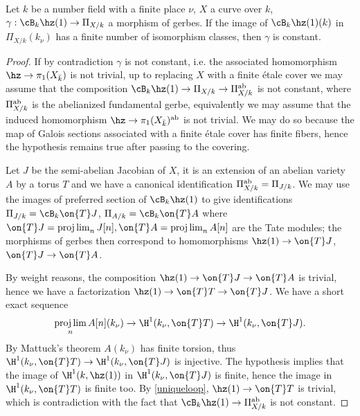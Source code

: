 \begin{lemma}
\notready\label{uniqueloop1}
	Let $k$ be a number field with a finite place $\nu$, $X$ a curve over $k$, $\gamma:\cB_{k}\hz(1)\to\Pi_{X/k}$ a morphism of gerbes. If the image of $\cB_{k}\hz(1)(k)$ in $\Pi_{X/k}(k_{\nu})$ has a finite number of isomorphism classes, then $\gamma$ is constant.
	\begin{proof}
		If by contradiction $\gamma$ is not constant, i.e. the associated homomorphism $\hz\to\pi_{1}(X_{\bar{k}})$ is not trivial, up to replacing $X$ with a finite étale cover we may assume that the composition $\cB_{k}\hz(1)\to\Pi_{X/k}\to\Pi_{X/k}^{\rm ab}$ is not constant, where $\Pi_{X/k}^{\rm ab}$ is the abelianized fundamental gerbe, equivalently we may assume that the induced homomorphism $\hz\to\pi_{1}(X_{\bar{k}})^{\rm ab}$ is not trivial. We may do so because the map of Galois sections associated with a finite étale cover has finite fibers, hence the hypothesis remains true after passing to the covering.

		Let $J$ be the semi-abelian Jacobian of $X$, it is an extension of an abelian variety $A$ by a torus $T$ and we have a canonical identification $\Pi_{X/k}^{\rm ab}=\Pi_{J/k}$. We may use the images of preferred section of $\cB_{k}\hz(1)$ to give identifications $\Pi_{J/k}=\cB_{k}\on{T}J$, $\Pi_{A/k}=\cB_{k}\on{T}A$ where $\on{T}J=\projlim_{n}J[n],\on{T}A=\projlim_{n}A[n]$ are the Tate modules; the morphisms of gerbes then correspond to homomorphisms $\hz(1)\to\on{T}J$, $\on{T}J\to\on{T}A$.



		By weight reasons, the composition $\hz(1)\to\on{T}J\to\on{T}A$ is trivial, hence we have a factorization $\hz(1)\to\on{T}T\to\on{T}J$. We have a short exact sequence
		\[\projlim_{n}A[n](k_{\nu})\to\H^{1}(k_{\nu},\on{T}T)\to\H^{1}(k_{\nu},\on{T}J).\]
		By Mattuck's theorem \cite{mat55} $A(k_{\nu})$ has finite torsion, thus $\H^{1}(k_{\nu},\on{T}T)\to\H^{1}(k_{\nu},\on{T}J)$ is injective. The hypothesis implies that the image of $\H^{1}(k,\hz(1))$ in $\H^{1}(k_{\nu},\on{T}J)$ is finite, hence the image in $\H^{1}(k_{\nu},\on{T}T)$ is finite too. By \autoref{uniqueloop}, $\hz(1)\to\on{T}T$ is trivial, which is contradiction with the fact that $\cB_{k}\hz(1)\to\Pi_{X/k}^{\rm ab}$ is not constant.

	\end{proof}
\end{lemma}
